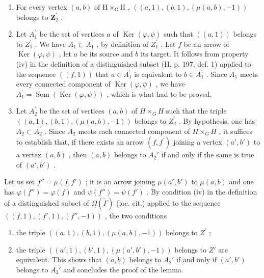 \begin{enumerate}
\def\labelenumi{\alph{enumi})}
\setcounter{enumi}{1}
\item
  For every vertex \((a,b)\) of \(\mathrm{H}\times_{\mathrm{G}}\mathrm{H}\) , \(((a,1),(b,1),(\mu(a,b),-1))\) belongs to \(\mathbf{Z}_2^{\prime}\) .
\item
  Let \(A_{1}^{\prime}\) be the set of vertices \(a\) of \(\operatorname{Ker}(\varphi,\psi)\) such that \(((a,1))\) belongs to \(Z_{1}^{\prime}\) . We have \(A_{1}\subset A_{1}^{\prime}\) , by definition of \(Z_{1}^{\prime}\) . Let \(f\) be an arrow of \(\operatorname{Ker}(\varphi,\psi)\) , let \(a\) be its source and \(b\) its target. It follows from property (iv) in the definition of a distinguished subset (II, p. 197, def. 1) applied to the sequence \(((f,1))\) that \(a\in A_{1}^{\prime}\) is equivalent to \(b\in A_{1}^{\prime}\) . Since \(A_{1}\) meets every connected component of \(\operatorname{Ker}(\varphi,\psi)\) , we have \(A_{1}^{\prime}=\operatorname{Som}(\operatorname{Ker}(\varphi,\psi))\) , which is what had to be proved.
\item
  Let \(A_{2}^{\prime}\) be the set of vertices \((a,b)\) of \(H \times_{G} H\) such that the triple \(((a,1),(b,1),(\mu(a,b),-1))\) belongs to \(Z_{2}^{\prime}\) . By hypothesis, one has \(A_{2} \subset A_{2}^{\prime}\) . Since \(A_{2}\) meets each connected component of \(H \times_{G} H\) , it suffices to establish that, if there exists an arrow \((f,f^{\prime})\) joining a vertex \((a', b')\) to a vertex \((a, b)\) , then \((a, b)\) belongs to \(A_2'\) if and only if the same is true of \((a', b')\) .
\end{enumerate}

Let us set \(f'' = \mu(f, f')\) ; it is an arrow joining \(\mu(a', b')\) to \(\mu(a, b)\) and one has \(\varphi(f'') = \varphi(f)\) and \(\psi(f'') = \psi(f')\) . By condition (iv) in the definition of a distinguished subset of \(\Omega(\widetilde{\Gamma})\) (loc. cit.) applied to the sequence \(((f, 1), (f', 1), (f'', -1))\) , the two conditions

\begin{enumerate}
\def\labelenumi{(\roman{enumi})}
\item
  the triple \(((a,1),(b,1),(\mu (a,b), - 1))\) belongs to \(Z^{\prime}\) ;
\item
  the triple \(((a',1),(b',1),(\mu(a',b'),-1))\) belongs to \(Z'\) are equivalent. This shows that \((a,b)\) belongs to \(A_{2}'\) if and only if \((a',b')\) belongs to \(A_{2}'\) and concludes the proof of the lemma.
\end{enumerate}

